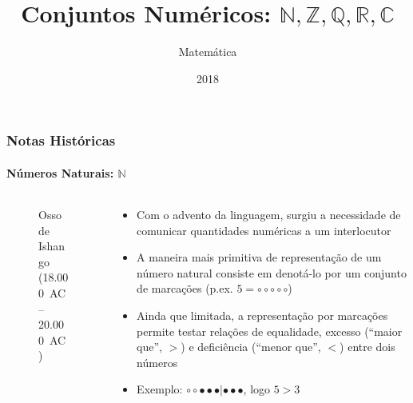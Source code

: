 \documentclass[usenames,dvipsnames,svgnames]{beamer}
\title{Conjuntos Numéricos: $\mathbb{N}, \mathbb{Z}, \mathbb{Q}, \mathbb{R}, \mathbb{C}$}
\author{Matemática}
\institute{ONGEP}
\date{2018}
\begin{document}
\frame{\titlepage}

\begin{frame}	
	\frametitle{Notas Históricas}
	\framesubtitle{Números Naturais: $\mathbb{N}$}

	\begin{columns}[t]
	\begin{column}{.25\textwidth}
		\begin{figure}
			\caption{\small Osso de Ishango (18.000~AC -- 20.000~AC)}
		\end{figure}
	\end{column}
	\begin{column}{.75\textwidth}
		\begin{itemize}
		\item Com o advento da linguagem, surgiu a necessidade de comunicar quantidades numéricas a um interlocutor
		\item A maneira mais primitiva de representação de um número natural consiste em denotá-lo por um conjunto de marcações (p.ex. $5 = \circ \circ \circ \circ \circ$)
		\item Ainda que limitada, a representação por marcações permite testar relações de equalidade, excesso (``maior que'', $>$) e deficiência (``menor que'', $<$) entre dois números
		\item Exemplo: $\circ \circ \bullet \bullet \bullet | \bullet \bullet \bullet$, logo $5 > 3$
		\end{itemize}
	\end{column}
	\end{columns}
\end{frame}
\end{document}
